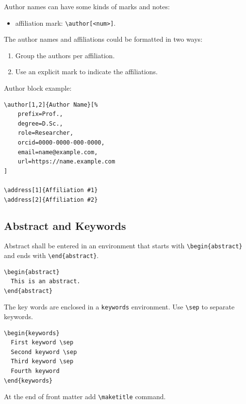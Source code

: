 \documentclass[]{ceurart}
\begin{document}
Author names can have some kinds of marks and notes:
\begin{itemize}
\item affiliation mark: \verb|\author[<num>]|.
\end{itemize}

The author names and affiliations could be formatted in two ways:
\begin{enumerate}
\item Group the authors per affiliation.
\item Use an explicit mark to indicate the affiliations.
\end{enumerate}

Author block example:
\begin{verbatim}
\author[1,2]{Author Name}[%
    prefix=Prof.,
    degree=D.Sc.,
    role=Researcher,
    orcid=0000-0000-000-0000,
    email=name@example.com,
    url=https://name.example.com
]

\address[1]{Affiliation #1}
\address[2]{Affiliation #2}
\end{verbatim}

\subsection{Abstract and Keywords}

Abstract shall be entered in an environment that starts
with \verb|\begin{abstract}| and ends with
\verb|\end{abstract}|. 

\begin{verbatim}
\begin{abstract}
  This is an abstract.
\end{abstract}
\end{verbatim}

The key words are enclosed in a \verb|keywords|
environment. Use \verb|\sep| to separate keywords.

\begin{verbatim}
\begin{keywords}
  First keyword \sep 
  Second keyword \sep 
  Third keyword \sep 
  Fourth keyword
\end{keywords}
\end{verbatim}

At the end of front matter add \verb|\maketitle| command.
\end{document}
